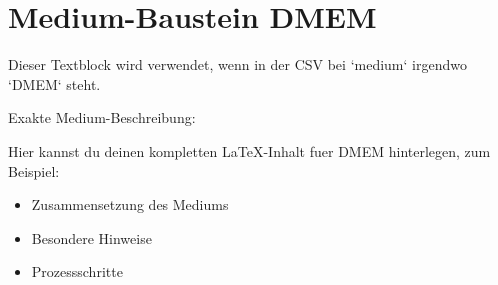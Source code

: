 \section*{Medium-Baustein DMEM}

Dieser Textblock wird verwendet, wenn in der CSV bei `medium` irgendwo `DMEM` steht.

Exakte Medium-Beschreibung:

\textbf{\MediumBeschreibung}

Hier kannst du deinen kompletten LaTeX-Inhalt fuer DMEM hinterlegen, zum Beispiel:

\begin{itemize}
\item Zusammensetzung des Mediums
\item Besondere Hinweise
\item Prozessschritte
\end{itemize}
